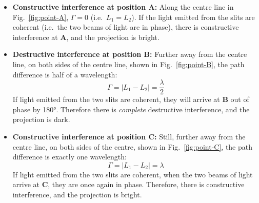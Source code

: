 \begin{itemize}[itemsep=6pt]
\item\textbf{Constructive interference at position A:} Along the centre line in
  Fig.~\ref{fig:point-A}, $\Gamma=0$ (i.e.\ $L_1=L_2$). If the light emitted
  from the slits are coherent (i.e.\ the two beams of light are in phase),
  there is constructive interference at \textbf{A}, and the projection is
  bright.

\item\textbf{Destructive interference at position B:} Further away from the
  centre line, on both sides of the centre line, shown in
  Fig.~\ref{fig:point-B}, the path difference is half of a wavelength:
  \begin{equation*}   
    \Gamma=|L_1-L_2|=\frac\lambda2
  \end{equation*}
  If light emitted from the two slits are coherent, they will arrive at
  \textbf{B} out of phase by \ang{180}. Therefore there is \emph{complete}
  destructive interference, and the projection is dark.
  
\item\textbf{Constructive interference at position C:} Still, further away from
  the centre line, on both sides of the centre, shown in
  Fig.~\ref{fig:point-C}, the path difference is exactly one wavelength:
  \begin{equation*}
    \Gamma=|L_1-L_2|=\lambda
  \end{equation*}
  If light emitted from the two slits are coherent, when the two beams of light
  arrive at \textbf{C}, they are once again in phase. Therefore, there is 
  constructive interference, and the projection is bright.
\end{itemize}

